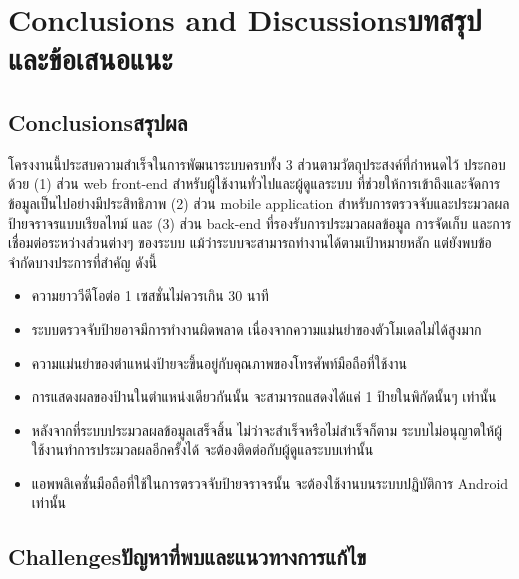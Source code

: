\chapter{\ifenglish Conclusions and Discussions\else บทสรุปและข้อเสนอแนะ\fi}

\section{\ifenglish Conclusions\else สรุปผล\fi}

โครงงานนี้ประสบความสำเร็จในการพัฒนาระบบครบทั้ง 3 ส่วนตามวัตถุประสงค์ที่กำหนดไว้ ประกอบด้วย (1) ส่วน web front-end สำหรับผู้ใช้งานทั่วไปและผู้ดูแลระบบ ที่ช่วยให้การเข้าถึงและจัดการข้อมูลเป็นไปอย่างมีประสิทธิภาพ (2) ส่วน mobile application สำหรับการตรวจจับและประมวลผลป้ายจราจรแบบเรียลไทม์ และ (3) ส่วน back-end ที่รองรับการประมวลผลข้อมูล การจัดเก็บ และการเชื่อมต่อระหว่างส่วนต่างๆ ของระบบ แม้ว่าระบบจะสามารถทำงานได้ตามเป้าหมายหลัก แต่ยังพบข้อจำกัดบางประการที่สำคัญ ดังนี้

\begin{itemize}
    \item ความยาววีดีโอต่อ 1 เซสชั่นไม่ควรเกิน 30 นาที
    \item ระบบตรวจจับป้ายอาจมีการทำงานผิดพลาด เนื่องจากความแม่นยำของตัวโมเดลไม่ได้สูงมาก
    \item ความแม่นยำของตำแหน่งป้ายจะขึ้นอยู่กับคุณภาพของโทรศัพท์มือถือที่ใช้งาน
    \item การแสดงผลของป้านในตำแหน่งเดียวกันนั้น จะสามารถแสดงได้แค่ 1 ป้ายในพิกัดนั้นๆ เท่านั้น
    \item หลังจากที่ระบบประมวลผลข้อมูลเสร็จสิ้น ไม่ว่าจะสำเร็จหรือไม่สำเร็จก็ตาม ระบบไม่อนุญาตให้ผู้ใช้งานทำการประมวลผลอีกครั้งได้ จะต้องติดต่อกับผู้ดูแลระบบเท่านั้น
    \item แอพพลิเคชั่นมือถือที่ใช้ในการตรวจจับป้ายจราจรนั้น จะต้องใช้งานบนระบบปฏิบัติการ Android \\เท่านั้น
\end{itemize}

\section{\ifenglish Challenges\else ปัญหาที่พบและแนวทางการแก้ไข\fi}

